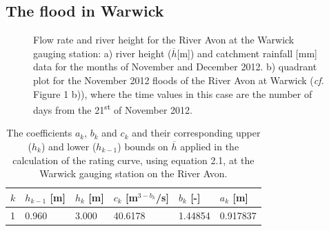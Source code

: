 \documentclass[11pt,a4paper]{article}
\begin{document}
\subsection{The flood in Warwick}
\begin{figure}[H]
\centering
{}
\hfill
{}
\caption{Flow rate and river height for the River Avon at the Warwick gauging station: a) river height ($\overline{h}$[m]) \cite{EA} and catchment rainfall [mm] data \cite{NRFA} for the months of November and December 2012. b) quadrant plot for the November 2012 floods of the River Avon at Warwick (\textit{cf.} Figure 1 b)), where the time values in this case are the number of days from the 21\textsuperscript{st} of November 2012.}
\end{figure}

\begin{table}[H]
\centering
\begin{tabular}{l|l|l|l|l|l}
$k$ & $h_{k-1}$ [m] & $h_k$ [m] & $c_k$ [m$^{3-b_k}$/s] & $b_k$ [-] & $a_k$ [m]\\
\hline
1 & 0.960 & 3.000 & 40.6178 & 1.44854 & 0.917837 \\
\end{tabular}
\caption{The coefficients $a_k$, $b_k$ and $c_k$ and their corresponding upper ($h_k$) and lower ($h_{k-1}$) bounds on $\overline{h}$ \cite{EA} applied in the calculation of the rating curve, using equation 2.1, at the Warwick gauging station on the River Avon.}
\end{table}
\end{document}
